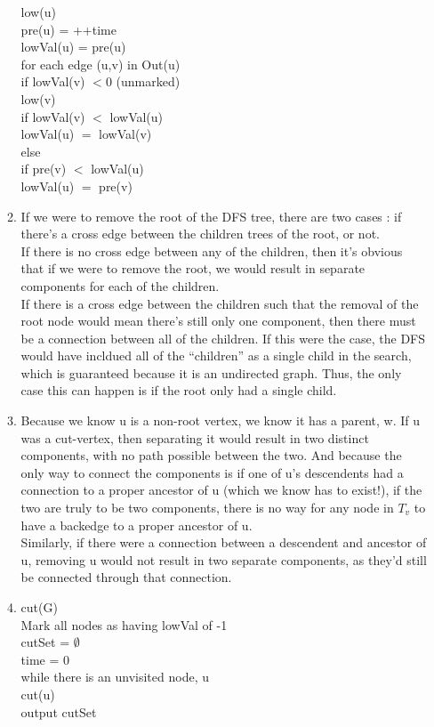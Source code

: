 \begin{enumerate}
\begin{enumerate}
\begin{algorithm}
        
        low(u)\\
        \>pre(u) = ++time\\
        \>lowVal(u) = pre(u)\\
        \>for each edge (u,v) in Out(u)\\
        \>\>if lowVal(v) $< 0$ (unmarked)\\
        \>\>\>low(v)\\
        \>\>\>if lowVal(v) $<$ lowVal(u)\\
        \>\>\>\>lowVal(u) $=$ lowVal(v)\\
        \>\>else\\
        \>\>\>if pre(v) $<$ lowVal(u)\\
        \>\>\>\>lowVal(u) $=$ pre(v)\\
      \end{algorithm}
    \item
      If we were to remove the root of the DFS tree, there are two cases : if there's a cross edge between the children trees of the root, or not.\\
      If there is no cross edge between any of the children, then it's obvious that if we were to remove the root, we would result in separate components for each of the children.\\
      If there is a cross edge between the children such that the removal of the root node would mean there's still only one component, then there must be a connection between all of the children. If this were the case, the DFS would have incldued all of the ``children'' as a single child in the search, which is guaranteed because it is an undirected graph. Thus, the only case this can happen is if the root only had a single child.
    \item
      Because we know u is a non-root vertex, we know it has a parent, w. If u was a cut-vertex, then separating it would result in two distinct components, with no path possible between the two. And because the only way to connect the components is if one of u's descendents had a connection to a proper ancestor of u (which we know has to exist!), if the two are truly to be two components, there is no way for any node in $T_v$ to have a backedge to a proper ancestor of u.\\
      Similarly, if there were a connection between a descendent and ancestor of u, removing u would not result in two separate components, as they'd still be connected through that connection.
    \item
      \begin{algorithm}
        cut(G)\\
        \>Mark all nodes as having lowVal of -1\\
        \>cutSet = $\emptyset$\\
        \>time = 0\\
        \>while there is an unvisited node, u\\
        \>\>cut(u)\\
        \>output cutSet\\\\
        

\end{algorithm}
\end{enumerate}
\end{enumerate}
